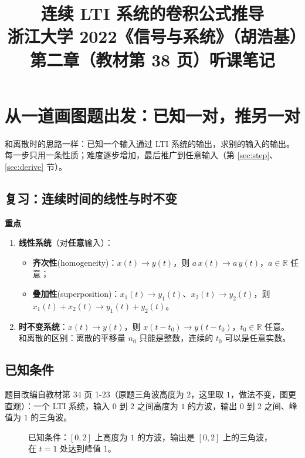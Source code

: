 \documentclass[UTF8,a4paper,11pt]{ctexart}
\title{连续 LTI 系统的卷积公式推导\\\large 浙江大学 2022《信号与系统》（胡浩基）第二章（教材第 38 页）听课笔记}
\author{}
\date{}
\newenvironment{remember}{\begin{rememberbox}\textbf{重点}\par\smallskip}{\end{rememberbox}}
\newcommand{\taxes}[4][t]{%
  \draw[->] (#2,0) -- (#3,0) node[right,font=\scriptsize] {$#1$};
  \draw[->] (0,-0.3) -- (0,#4);
  \node[anchor=north east,font=\tiny,gray!60!black,inner sep=1pt] at (0,-0.02) {$0$};}
\newcommand{\xt}[2]{\draw (#1,0) -- (#1,-0.1) node[anchor=north,font=\tiny,gray!60!black,fill=white,inner sep=0.6pt] {$#2$};}
\newcommand{\yt}[2]{\draw (0,#1) -- (-0.1,#1) node[anchor=east,font=\tiny,gray!60!black,fill=white,inner sep=0.6pt] {$#2$};}
\newcommand{\pair}[7]{%
  \begin{scope}[shift={(0,#1)}]
    #2
    \node[anchor=west,font=\footnotesize] at (0.15,2.45) {#4};
    \draw[->,thick] (5.0,1) -- (7.0,1) node[midway,above,font=\footnotesize] {#6};
    \begin{scope}[shift={(8,0)}]
      #3
      \node[anchor=west,font=\footnotesize] at (0.15,2.45) {#5};
    \end{scope}
    \node[anchor=west,font=\footnotesize] at (13.0,1) {#7};
  \end{scope}}
\newcounter{ex}[section]
\begin{document}
\pagestyle{plain}
\maketitle

\section{从一道画图题出发：已知一对，推另一对}\label{sec:draw}
和离散时的思路一样：已知一个输入通过 LTI 系统的输出，求别的输入的输出。每一步只用一条性质；难度逐步增加，最后推广到任意输入（第 \ref{sec:step}、\ref{sec:derive} 节）。

\subsection{复习：连续时间的线性与时不变}
\begin{remember}
\begin{enumerate}[nosep]
\item \textbf{线性系统}（对\textbf{任意}输入）：
  \begin{itemize}[nosep]
  \item \textbf{齐次性}(homogeneity)：$x(t)\to y(t)$，则 $a\,x(t)\to a\,y(t)$，$a\in\mathbb{R}$ 任意；
  \item \textbf{叠加性}(superposition)：$x_1(t)\to y_1(t)$、$x_2(t)\to y_2(t)$，则 $x_1(t)+x_2(t)\to y_1(t)+y_2(t)$。
  \end{itemize}
\item \textbf{时不变系统}：$x(t)\to y(t)$，则 $x(t-t_0)\to y(t-t_0)$，$t_0\in\mathbb{R}$ 任意。\\
  和离散的区别：离散的平移量 $n_0$ 只能是整数，连续的 $t_0$ 可以是任意实数。
\end{enumerate}
\end{remember}

\subsection{已知条件}
题目改编自教材第 34 页 1-23（原题三角波高度为 $2$，这里取 $1$，做法不变，图更直观）：一个 LTI 系统，输入 $0$ 到 $2$ 之间高度为 $1$ 的方波，输出 $0$ 到 $2$ 之间、峰值为 $1$ 的三角波。

\begin{figure}[H]
\centering
{}
\caption{已知条件：$[0,2]$ 上高度为 $1$ 的方波，输出是 $[0,2]$ 上的三角波，在 $t=1$ 处达到峰值 $1$。}
\end{figure}
\end{document}
